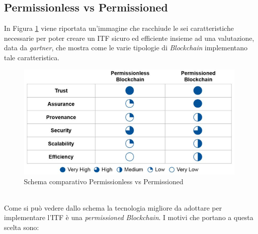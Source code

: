 \subsection{Permissionless vs Permissioned}
In Figura \ref{img:permisionedVSpermissionless} viene riportata un'immagine che racchiude le sei caratteristiche necessarie per poter creare un \gls{ITF} sicuro ed efficiente insieme ad una valutazione, data da \emph{\gls{gartner}}\glsfirstoccur, che mostra come le varie tipologie di \textit{Blockchain} implementano tale caratteristica.
\begin{figure}[h]
	\centering
	\includegraphics[scale=0.50]{immagini/blockchain_ability_to_implement_ITF}
	\caption{Schema comparativo Permissionless vs Permissioned}
	\label{img:permisionedVSpermissionless}
\end{figure} 
\\
Come si può vedere dallo schema la tecnologia migliore da adottare per implementare l'\gls{ITF} è una \textit{permissioned Blockchain}.
I motivi che portano a questa scelta sono:
